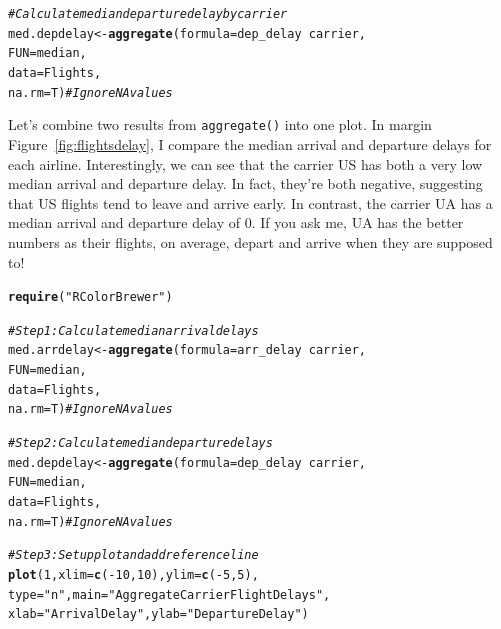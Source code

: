 \documentclass{tufte-book}\usepackage[]{graphicx}\usepackage[]{color}
\makeatletter
\newcommand{\hlnum}[1]{\textcolor[rgb]{0.686,0.059,0.569}{#1}}%
\newcommand{\hlstr}[1]{\textcolor[rgb]{0.192,0.494,0.8}{#1}}%
\newcommand{\hlcom}[1]{\textcolor[rgb]{0.678,0.584,0.686}{\textit{#1}}}%
\newcommand{\hlopt}[1]{\textcolor[rgb]{0,0,0}{#1}}%
\newcommand{\hlstd}[1]{\textcolor[rgb]{0.345,0.345,0.345}{#1}}%
\newcommand{\hlkwb}[1]{\textcolor[rgb]{0.69,0.353,0.396}{#1}}%
\newcommand{\hlkwc}[1]{\textcolor[rgb]{0.333,0.667,0.333}{#1}}%
\newcommand{\hlkwd}[1]{\textcolor[rgb]{0.737,0.353,0.396}{\textbf{#1}}}%
\newenvironment{kframe}{%
 \def\at@end@of@kframe{}%
 \ifinner\ifhmode%
  \def\at@end@of@kframe{\end{minipage}}%
  \begin{minipage}{\columnwidth}%
 \fi\fi%
 \def\FrameCommand##1{\hskip\@totalleftmargin \hskip-\fboxsep
 \colorbox{shadecolor}{##1}\hskip-\fboxsep
     \hskip-\linewidth \hskip-\@totalleftmargin \hskip\columnwidth}%
 \MakeFramed {\advance\hsize-\width
   \@totalleftmargin\z@ \linewidth\hsize
   \@setminipage}}%
 {\par\unskip\endMakeFramed%
 \at@end@of@kframe}
\newenvironment{knitrout}{}{} %
\makeatother
\begin{document}
\begin{footnotesize}
\begin{footnotesize}
\begin{knitrout}
\begin{kframe}
\begin{alltt}
\hlcom{# Calculate median  departure delay by carrier}
\hlstd{med.depdelay} \hlkwb{<-} \hlkwd{aggregate}\hlstd{(}\hlkwc{formula} \hlstd{= dep_delay} \hlopt{~} \hlstd{carrier,}
            \hlkwc{FUN} \hlstd{= median,}
            \hlkwc{data} \hlstd{= Flights,}
            \hlkwc{na.rm} \hlstd{= T)} \hlcom{# Ignore NA values}
\end{alltt}
\end{kframe}
\end{knitrout}

\end{footnotesize}

Let's combine two results from \texttt{aggregate()} into one plot. In margin Figure~\ref{fig:flightsdelay}, I compare the median arrival and departure delays for each airline. Interestingly, we can see that the carrier US has both a very low median arrival and departure delay. In fact, they're both negative, suggesting that US flights tend to leave and arrive early. In contrast, the carrier UA has a median arrival and departure delay of 0. If you ask me, UA has the better numbers as their flights, on average, depart and arrive when they are supposed to!

\begin{marginfigure}
\begin{tiny}
\begin{knitrout}
\color{fgcolor}\begin{kframe}
\begin{alltt}
\hlkwd{require}\hlstd{(}\hlstr{"RColorBrewer"}\hlstd{)}

\hlcom{# Step 1: Calculate median arrival delays}
\hlstd{med.arrdelay} \hlkwb{<-} \hlkwd{aggregate}\hlstd{(}\hlkwc{formula} \hlstd{= arr_delay} \hlopt{~} \hlstd{carrier,}
            \hlkwc{FUN} \hlstd{= median,}
            \hlkwc{data} \hlstd{= Flights,}
            \hlkwc{na.rm} \hlstd{= T)} \hlcom{# Ignore NA values}


\hlcom{# Step 2: Calculate median departure delays}
\hlstd{med.depdelay} \hlkwb{<-} \hlkwd{aggregate}\hlstd{(}\hlkwc{formula} \hlstd{= dep_delay} \hlopt{~} \hlstd{carrier,}
            \hlkwc{FUN} \hlstd{= median,}
            \hlkwc{data} \hlstd{= Flights,}
            \hlkwc{na.rm} \hlstd{= T)} \hlcom{# Ignore NA values}

\hlcom{# Step 3: Set up plot and add reference line}
\hlkwd{plot}\hlstd{(}\hlnum{1}\hlstd{,} \hlkwc{xlim} \hlstd{=} \hlkwd{c}\hlstd{(}\hlopt{-}\hlnum{10}\hlstd{,} \hlnum{10}\hlstd{),} \hlkwc{ylim} \hlstd{=} \hlkwd{c}\hlstd{(}\hlopt{-}\hlnum{5}\hlstd{,} \hlnum{5}\hlstd{),}
     \hlkwc{type} \hlstd{=} \hlstr{"n"}\hlstd{,} \hlkwc{main} \hlstd{=} \hlstr{"Aggregate Carrier Flight Delays"}\hlstd{,}
     \hlkwc{xlab} \hlstd{=} \hlstr{"Arrival Delay"}\hlstd{,}  \hlkwc{ylab} \hlstd{=} \hlstr{"Departure Delay"}\hlstd{)}


\end{alltt}
\end{kframe}
\end{knitrout}
\end{tiny}
\end{marginfigure}
\end{footnotesize}
\end{document}
